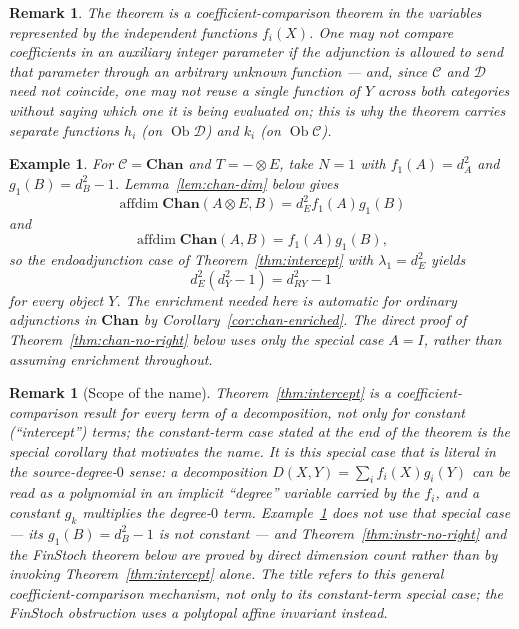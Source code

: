 \documentclass[11pt]{article}
\newtheorem{remark}[theorem]{Remark}
\newtheorem{example}[theorem]{Example}
\DeclareMathOperator{\affdim}{affdim}
\DeclareMathOperator{\Ob}{Ob}
\begin{document}
\begin{remark}
The theorem is a coefficient-comparison theorem in the variables represented
by the independent functions $f_i(X)$. One may not compare coefficients in an
auxiliary integer parameter if the adjunction is allowed to send that
parameter through an arbitrary unknown function --- and, since $\mathcal C$
and $\mathcal D$ need not coincide, one may not reuse a single function of $Y$
across both categories without saying which one it is being evaluated on; this
is why the theorem carries separate functions $h_i$ (on $\Ob\mathcal D$) and
$k_i$ (on $\Ob\mathcal C$).
\end{remark}

\begin{example}
\label{ex:chan-intercept}
For $\mathcal C=\mathbf{Chan}$ and $T=-\otimes E$, take $N=1$ with
$f_1(A)=d_A^2$ and $g_1(B)=d_B^2-1$. Lemma~\ref{lem:chan-dim} below gives
\[
\affdim\mathbf{Chan}(A\otimes E,B)
=
d_E^2 f_1(A)g_1(B)
\]
and
\[
\affdim\mathbf{Chan}(A,B)=f_1(A)g_1(B),
\]
so the endoadjunction case of Theorem~\ref{thm:intercept} with
$\lambda_1=d_E^2$ yields
\[
d_E^2(d_Y^2-1)=d_{RY}^2-1
\]
for every object $Y$. The enrichment needed here is automatic for ordinary
adjunctions in $\mathbf{Chan}$ by Corollary~\ref{cor:chan-enriched}. The
direct proof of Theorem~\ref{thm:chan-no-right} below uses only the special
case $A=I$, rather than assuming enrichment throughout.
\end{example}

\begin{remark}[Scope of the name]
\label{rem:intercept-scope}
Theorem~\ref{thm:intercept} is a coefficient-comparison result for every term
of a decomposition, not only for constant (``intercept'') terms; the
constant-term case stated at the end of the theorem is the special corollary
that motivates the name. It is this special case that is literal in the
source-degree-$0$ sense: a decomposition
$D(X,Y)=\sum_i f_i(X)g_i(Y)$ can be read as a polynomial in an implicit
``degree'' variable carried by the $f_i$, and a constant $g_k$ multiplies the
degree-$0$ term. Example~\ref{ex:chan-intercept} does not use that special
case --- its $g_1(B)=d_B^2-1$ is not constant --- and
Theorem~\ref{thm:instr-no-right} and the FinStoch theorem below are proved by
direct dimension count rather than by invoking
Theorem~\ref{thm:intercept} alone. The title refers to this general
coefficient-comparison mechanism, not only to its constant-term special case;
the FinStoch obstruction uses a polytopal affine invariant instead.
\end{remark}
\end{document}
